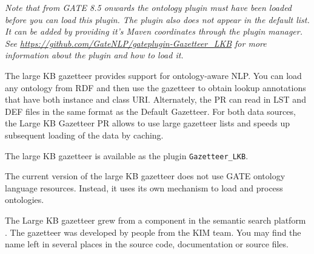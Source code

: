 \textit{Note that from GATE 8.5 onwards the ontology plugin must have been
loaded before you can load this plugin. The plugin also does not appear in
the default list. It can be added by providing it's Maven coordinates through
the plugin manager. See \url{https://github.com/GateNLP/gateplugin-Gazetteer_LKB}
for more information about the plugin and how to load it.}

The large KB gazetteer provides support for ontology-aware NLP. You can load
any ontology from RDF and then use the gazetteer to obtain lookup annotations
that have both instance and class URI. Alternately, the PR can read in
LST and DEF files in the same format as the Default Gazetteer. For both
data sources, the Large KB Gazetteer PR allows to use large gazetteer
lists and speeds up subsequent loading of the data by caching.

The large KB gazetteer is available as the plugin \texttt{Gazetteer\_LKB}.

The current version of the large KB gazetteer does not use GATE ontology
language resources. Instead, it uses its own mechanism to load and
process ontologies. 

The Large KB gazetteer grew from a component in the semantic search platform
. The gazetteer was developed by
people from the KIM team. You
may find the name  left in several places in the source code,
documentation or source files.


